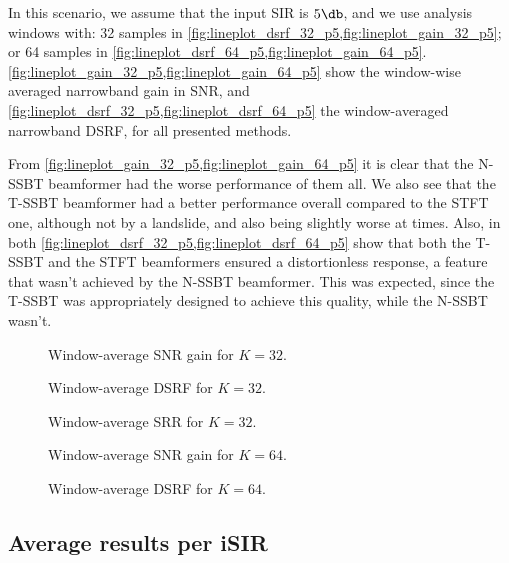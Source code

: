 In this scenario, we assume that the input SIR is $5\dB$, and we use analysis windows with: 32 samples in \cref{fig:lineplot_dsrf_32_p5,fig:lineplot_gain_32_p5}; or 64 samples in \cref{fig:lineplot_dsrf_64_p5,fig:lineplot_gain_64_p5}. \cref{fig:lineplot_gain_32_p5,fig:lineplot_gain_64_p5} show the window-wise averaged narrowband gain in SNR, and \cref{fig:lineplot_dsrf_32_p5,fig:lineplot_dsrf_64_p5} the window-averaged narrowband DSRF, for all presented methods.

From \cref{fig:lineplot_gain_32_p5,fig:lineplot_gain_64_p5} it is clear that the N-SSBT beamformer had the worse performance of them all. We also see that the T-SSBT beamformer had a better performance overall compared to the STFT one, although not by a landslide, and also being slightly worse at times. Also, in both \cref{fig:lineplot_dsrf_32_p5,fig:lineplot_dsrf_64_p5} show that both the T-SSBT and the STFT beamformers ensured a distortionless response, a feature that wasn't achieved by the N-SSBT beamformer. This was expected, since the T-SSBT was appropriately designed to achieve this quality, while the N-SSBT wasn't.


\begin{figure}[H]
\centering

\caption{Window-average SNR gain for $K = 32$.}
\label{fig:lineplot_gain_32_p5}
\end{figure}
\begin{figure}[H]
	\centering
	
	\caption{Window-average DSRF for $K = 32$.}
	\label{fig:lineplot_dsrf_32_p5}
\end{figure}
\begin{figure}[H]
	\centering
	
	\caption{Window-average SRR for $K = 32$.}
	\label{fig:lineplot_gsrr_32_p5}
\end{figure}


\begin{figure}[H]
\centering

\caption{Window-average SNR gain for $K = 64$.}
\label{fig:lineplot_gain_64_p5}
\end{figure}
\begin{figure}[H]
	\centering
	
	\caption{Window-average DSRF for $K = 64$.}
	\label{fig:lineplot_dsrf_64_p5}
\end{figure}

\subsection{Average results per iSIR}

